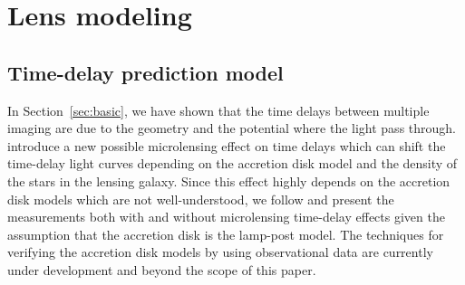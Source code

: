 \documentclass[useAMS,usenatbib]{mnras}
\newcommand{\sref}[1]{Section~\ref{#1}}
\begin{document}



\section{Lens modeling}
\label{sec:modeling}



\subsection{Time-delay prediction model}
\label{sec:TD_model}
In \sref{sec:basic}, we have shown that the time delays between multiple imaging are due to the geometry and the potential where the light pass through. \citet{TieKochanek18} introduce a new possible microlensing effect on time delays which can shift the time-delay light curves depending on the accretion disk model and the density of the stars in the lensing galaxy. Since this effect highly depends on the accretion disk models which are not well-understood, we follow \citet{GChenEtal18a} and present the measurements both with and without microlensing time-delay effects given the assumption that the accretion disk is the lamp-post model. The techniques for verifying the accretion disk models by using observational data are currently under development and beyond the scope of this paper.
\end{document}
